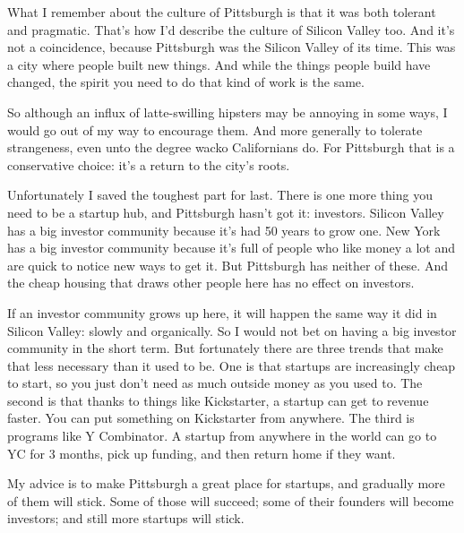 What
                  I remember about the culture of Pittsburgh is that it was both
                  tolerant and pragmatic. That's how I'd describe the culture of
                  Silicon Valley too. And it's not a coincidence, because
                  Pittsburgh was the Silicon Valley of its time. This was a city
                  where people built new things. And while the things people
                  build have changed, the spirit you need to do that kind of
                  work is the same.

So although an influx of
                  latte-swilling hipsters may be annoying in some ways, I would
                  go out of my way to encourage them. And more generally to
                  tolerate strangeness, even unto the degree wacko Californians
                  do. For Pittsburgh that is a conservative choice: it's a
                  return to the city's roots.

Unfortunately I saved
                  the toughest part for last. There is one more thing you need
                  to be a startup hub, and Pittsburgh hasn't got it: investors.
                  Silicon Valley has a big investor community because it's had
                  50 years to grow one. New York has a big investor community
                  because it's full of people who like money a lot and are quick
                  to notice new ways to get it. But Pittsburgh has neither of
                  these. And the cheap housing that draws other people here has
                  no effect on investors.

If an investor community
                  grows up here, it will happen the same way it did in Silicon
                  Valley: slowly and organically. So I would not bet on having a
                  big investor community in the short term. But fortunately
                  there are three trends that make that less necessary than it
                  used to be. One is that startups are increasingly cheap to
                  start, so you just don't need as much outside money as you
                  used to. The second is that thanks to things like Kickstarter,
                  a startup can get to revenue faster. You can put something on
                  Kickstarter from anywhere. The third is programs like Y
                  Combinator. A startup from anywhere in the world can go to YC
                  for 3 months, pick up funding, and then return home if they
                  want.

My advice is to make Pittsburgh a great place
                  for startups, and gradually more of them will stick. Some of
                  those will succeed; some of their founders will become
                  investors; and still more startups will stick.

